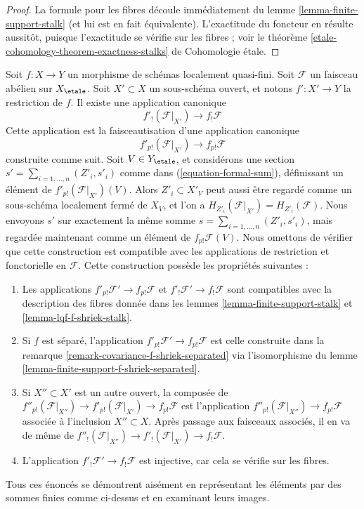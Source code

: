 \begin{proof}
La formule pour les fibres découle immédiatement du
lemme \ref{lemma-finite-support-stalk} (et lui est en fait équivalente).
L'exactitude du foncteur en résulte aussitôt,
puisque l'exactitude se vérifie sur les fibres ; voir le
théorème \ref{etale-cohomology-theorem-exactness-stalks} de Cohomologie étale.
\end{proof}

\begin{remark}
\label{remark-covariance-lqf-f-shriek}
Soit $f : X \to Y$ un morphisme de schémas localement quasi-fini. Soit
$\mathcal{F}$ un faisceau abélien sur $X_\etale$.
Soit $X' \subset X$ un sous-schéma ouvert, et notons $f' : X' \to Y$
la restriction de $f$.
Il existe une application canonique
$$
f'_!(\mathcal{F}|_{X'}) \longrightarrow f_!\mathcal{F}
$$
Cette application est la faisceautisation d'une application canonique
$$
f'_{p!}(\mathcal{F}|_{X'}) \to f_{p!}\mathcal{F}
$$
construite comme suit. Soit $V \in Y_\etale$, et considérons une section
$s' = \sum_{i = 1, \ldots, n} (Z'_i, s'_i)$ comme dans
(\ref{equation-formal-sum}), définissant un élément de
$f'_{p!}(\mathcal{F}|_{X'})(V)$.
Alors $Z'_i \subset X'_V$ peut aussi être regardé comme un sous-schéma localement fermé
de $X_V$, et l'on a $H_{Z'_i}(\mathcal{F}|_{X'}) = H_{Z'_i}(\mathcal{F})$.
Nous envoyons $s'$ sur exactement la même somme
$s = \sum_{i = 1, \ldots, n} (Z'_i, s'_i)$,
mais regardée maintenant comme un élément de $f_{p!}\mathcal{F}(V)$.
Nous omettons de vérifier que cette construction est compatible avec les
applications de restriction et fonctorielle en $\mathcal{F}$.
Cette construction possède les propriétés suivantes :
\begin{enumerate}
\item Les applications $f'_{p!}\mathcal{F}' \to f_{p!}\mathcal{F}$ et
$f'_!\mathcal{F}' \to f_!\mathcal{F}$ sont compatibles avec
la description des fibres donnée dans les lemmes
\ref{lemma-finite-support-stalk} et \ref{lemma-lqf-f-shriek-stalk}.
\item Si $f$ est séparé, l'application
$f'_{p!}\mathcal{F}' \to f_{p!}\mathcal{F}$ est celle
construite dans la remarque \ref{remark-covariance-f-shriek-separated}
via l'isomorphisme du lemme \ref{lemma-finite-support-f-shriek-separated}.
\item Si $X'' \subset X'$ est un autre ouvert, la composée de
$f''_{p!}(\mathcal{F}|_{X''}) \to f'_{p!}(\mathcal{F}|_{X'}) \to
f_{p!}\mathcal{F}$ est l'application
$f''_{p!}(\mathcal{F}|_{X''}) \to f_{p!}\mathcal{F}$ associée à
l'inclusion $X'' \subset X$. Après passage aux faisceaux associés, il en va
de même de
$f''_!(\mathcal{F}|_{X''}) \to f'_!(\mathcal{F}|_{X'}) \to f_!\mathcal{F}$.
\item L'application $f'_!\mathcal{F}' \to f_!\mathcal{F}$ est injective,
car cela se vérifie sur les fibres.
\end{enumerate}
Tous ces énoncés se démontrent aisément en représentant les éléments
par des sommes finies comme ci-dessus et en examinant leurs images.
\end{remark}


